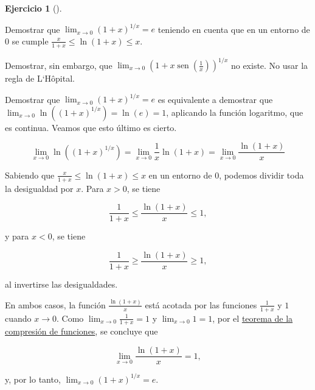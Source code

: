 \documentclass[
  spanish,
  a4paper,
]{scrreport}
\theoremstyle{definition}
\newtheorem{exercise}{Ejercicio}[chapter]
\theoremstyle{remark}
\begin{document}
\begin{exercise}[]\protect\hypertarget{exr-3}{}\label{exr-3}

Demostrar que \(\lim_{x\to 0} (1+x)^{1/x} = e\) teniendo en cuenta que
en un entorno de \(0\) se cumple \(\frac{x}{1+x} \leq \ln(1+x) \leq x\).

Demostrar, sin embargo, que
\(\lim_{x\to 0}\left(1+x\operatorname{sen}\left(\frac{1}{x}\right)\right)^{1/x}\)
no existe. No usar la regla de L`Hôpital.

\end{exercise}

\begin{tcolorbox}[enhanced jigsaw, arc=.35mm, bottomrule=.15mm, bottomtitle=1mm, breakable, colback=white, colbacktitle=quarto-callout-tip-color!10!white, colframe=quarto-callout-tip-color-frame, coltitle=black, left=2mm, leftrule=.75mm, opacityback=0, opacitybacktitle=0.6, rightrule=.15mm, title=\textcolor{quarto-callout-tip-color}{\faLightbulb}\hspace{0.5em}{Solución}, titlerule=0mm, toprule=.15mm, toptitle=1mm]

Demostrar que \(\lim_{x\to 0} (1+x)^{1/x} = e\) es equivalente a
demostrar que
\(\lim_{x\to 0} \ln\left((1+x)^{1/x}\right) = \ln(e) = 1\), aplicando la
función logaritmo, que es continua. Veamos que esto último es cierto.

\[
\lim_{x\to 0} \ln\left((1+x)^{1/x}\right) 
= \lim_{x\to 0} \frac{1}{x} \ln(1+x) 
= \lim_{x\to 0} \frac{\ln(1+x)}{x} 
\]

Sabiendo que \(\frac{x}{1+x} \leq \ln(1+x) \leq x\) en un entorno de 0,
podemos dividir toda la desigualdad por \(x\). Para \(x>0\), se tiene

\[
\frac{1}{1+x} \leq \frac{\ln(1+x)}{x} \leq 1,
\]

y para \(x<0\), se tiene

\[
\frac{1}{1+x} \geq \frac{\ln(1+x)}{x} \geq 1,
\]

al invertirse las desigualdades.

En ambos casos, la función \(\frac{\ln(1+x)}{x}\) está acotada por las
funciones \(\frac{1}{1+x}\) y \(1\) cuando \(x \to 0\). Como
\(\lim_{x\to 0} \frac{1}{1+x} = 1\) y \(\lim_{x\to 0} 1 = 1\), por el
\href{https://aprendeconalf.es/analisis-manual/06-limites.html\#thm-compresi\%C3\%B3n-funciones}{teorema
de la compresión de funciones}, se concluye que

\[
\lim_{x\to 0} \frac{\ln(1+x)}{x} = 1,
\]

y, por lo tanto, \(\lim_{x\to 0} (1+x)^{1/x} = e\).


\end{tcolorbox}
\end{document}
